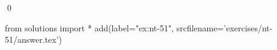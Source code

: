 
\begin{ex} 
  \label{ex:nt-51}
  
  \qed
\end{ex} 
\begin{python0}
from solutions import *
add(label="ex:nt-51",
    srcfilename='exercises/nt-51/answer.tex') 
\end{python0}
